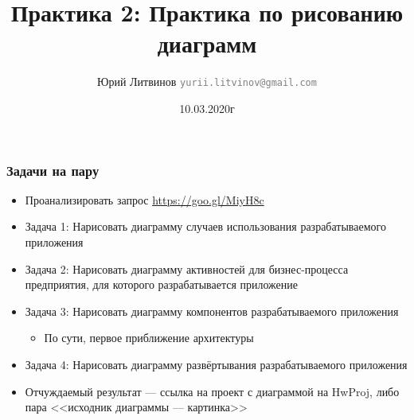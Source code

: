 \documentclass[xetex,mathserif,serif]{beamer}
\title{Практика 2: Практика по рисованию диаграмм}
\author[Юрий Литвинов]{Юрий Литвинов \newline \textcolor{gray}{\small\texttt{yurii.litvinov@gmail.com}}}
\date{10.03.2020г}
\begin{document}
	
	\frame{\titlepage}

	\begin{frame}
		\frametitle{Задачи на пару}
		\begin{itemize}
			\item Проанализировать запрос \url{https://goo.gl/MiyH8c}
			\item Задача 1: Нарисовать диаграмму случаев использования разрабатываемого приложения
			\item Задача 2: Нарисовать диаграмму активностей для бизнес-процесса предприятия, для которого разрабатывается приложение
			\item Задача 3: Нарисовать диаграмму компонентов разрабатываемого приложения
			\begin{itemize}
				\item По сути, первое приближение архитектуры
			\end{itemize}
			\item Задача 4: Нарисовать диаграмму развёртывания разрабатываемого приложения
			\item Отчуждаемый результат --- ссылка на проект с диаграммой на HwProj, либо пара <<исходник диаграммы --- картинка>>
		\end{itemize}
	\end{frame}
\end{document}
